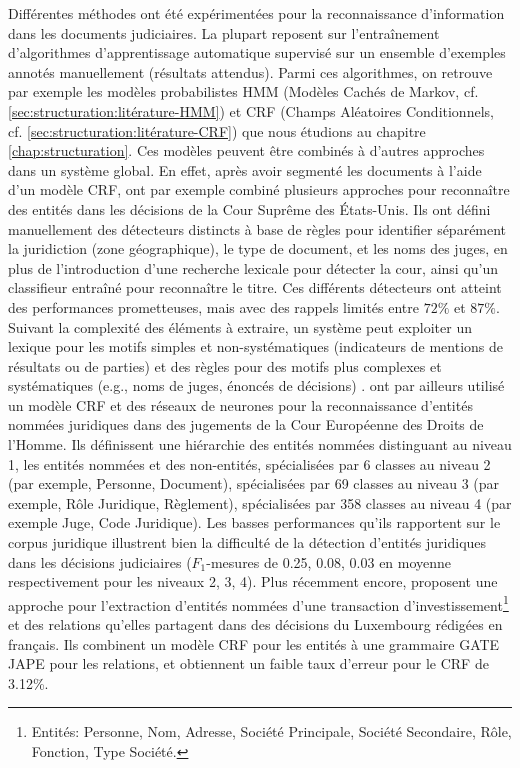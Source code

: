 Différentes méthodes ont été expérimentées pour la reconnaissance d'information dans les documents judiciaires. La plupart reposent sur l'entraînement d'algorithmes d'apprentissage automatique supervisé sur un ensemble d'exemples annotés manuellement (résultats attendus). Parmi ces algorithmes, on retrouve par exemple les modèles probabilistes HMM (Modèles Cachés de Markov, cf. \ref{sec:structuration:litérature-HMM}) et CRF (Champs Aléatoires Conditionnels, cf. \ref{sec:structuration:litérature-CRF}) que nous étudions au chapitre \ref{chap:structuration}. Ces modèles peuvent être combinés à d'autres approches dans un système global. En effet, après avoir segmenté les documents à l'aide d'un modèle CRF, \citet{dozier2010legalnerr} ont par exemple combiné plusieurs approches pour reconnaître des entités dans les décisions de la Cour Suprême des États-Unis. Ils ont défini manuellement des détecteurs distincts à base de règles pour identifier séparément la juridiction (zone géographique), le type de document, et les noms des juges, en plus de l'introduction d'une recherche lexicale pour détecter la cour, ainsi qu'un classifieur entraîné pour reconnaître le titre. Ces différents détecteurs ont atteint des performances prometteuses, mais avec des rappels limités entre $ 72 \% $ et $ 87 \% $. Suivant la complexité des éléments à extraire, un système peut exploiter un lexique pour les motifs simples et non-systématiques (indicateurs de mentions de résultats ou de parties) et des règles pour des motifs plus complexes et systématiques (e.g., noms de juges, énoncés de décisions) \citep{Waltl2016lexia,waltl2017legaliegerman, wyner2010extractlegalelts}. \cite{cardellino2017legalNERCL} ont par ailleurs utilisé un modèle CRF et des réseaux de neurones pour la reconnaissance d'entités nommées juridiques dans des jugements de la Cour Européenne des Droits de l'Homme.
Ils définissent une hiérarchie des entités nommées distinguant au niveau 1, les entités nommées et des non-entités,  spécialisées par 6 classes au niveau 2 (par exemple, Personne, Document), spécialisées par 69 classes au niveau 3 (par exemple, Rôle Juridique, Règlement), spécialisées par 358 classes au niveau 4 (par exemple Juge, Code Juridique). Les basses performances qu'ils rapportent sur le corpus juridique illustrent bien la difficulté de la détection d'entités juridiques dans les décisions judiciaires ($F_1$-mesures de 0.25, 0.08, 0.03 en moyenne respectivement pour les niveaux 2, 3, 4). Plus récemment encore, \citet{andrew2018legalNerAndRelation} proposent une approche pour l'extraction d'entités nommées d'une transaction d'investissement\footnote{Entités: Personne, Nom, Adresse, Société Principale, Société Secondaire, Rôle, Fonction, Type Société.} et des relations qu'elles partagent dans des décisions du Luxembourg rédigées en français. Ils combinent un modèle CRF pour les entités à  une grammaire GATE JAPE \citep{thakker2009gatejape} pour les relations, et obtiennent un faible taux d'erreur pour le CRF de 3.12\%. %

